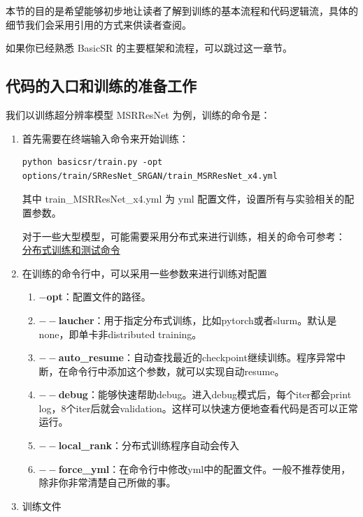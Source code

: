 \documentclass[../main.tex]{subfiles}
\begin{document}
本节的目的是希望能够初步地让读者了解到训练的基本流程和代码逻辑流，具体的细节我们会采用引用的方式来供读者查阅。

如果你已经熟悉 BasicSR 的主要框架和流程，可以跳过这一章节。

\subsection{代码的入口和训练的准备工作}
我们以训练超分辨率模型 MSRResNet 为例，训练的命令是：

\begin{enumerate}
    \item 首先需要在终端输入命令来开始训练：

\begin{verbatim}
python basicsr/train.py -opt options/train/SRResNet_SRGAN/train_MSRResNet_x4.yml
\end{verbatim}

    其中 train\_MSRResNet\_x4.yml 为 yml 配置文件，设置所有与实验相关的配置参数。

    对于一些大型模型，可能需要采用分布式来进行训练，相关的命令可参考：
    \href{https://github.com/XPixelGroup/BasicSR/blob/master/docs/TrainTest.md}{分布式训练和测试命令}

    \item 在训练的命令行中，可以采用一些参数来进行训练对配置

    \begin{enumerate}
    \item \textbf{$-$opt}：配置文件的路径。
    \item \textbf{$--$laucher}：用于指定分布式训练，比如pytorch或者slurm。默认是none，即单卡非distributed training。
    \item \textbf{$--$auto\_resume}：自动查找最近的checkpoint继续训练。程序异常中断，在命令行中添加这个参数，就可以实现自动resume。
    \item \textbf{$--$debug}：能够快速帮助debug。进入debug模式后，每个iter都会print log，8个iter后就会validation。这样可以快速方便地查看代码是否可以正常运行。
    \item \textbf{$--$local\_rank}：分布式训练程序自动会传入
    \item \textbf{$--$force\_yml}：在命令行中修改yml中的配置文件。一般不推荐使用，除非你非常清楚自己所做的事。
    \end{enumerate}

\item 训练文件


\end{enumerate}
\end{document}
